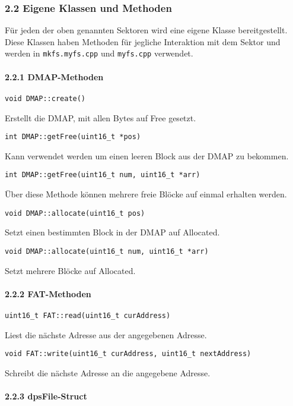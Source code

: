 \documentclass[]{article}
\let\oldparagraph\paragraph
\renewcommand{\paragraph}[1]{\oldparagraph{#1}\mbox{}}
\begin{document}
\hypertarget{eigene-klassen-und-methoden}{%
\subsubsection{2.2 Eigene Klassen und
Methoden}\label{eigene-klassen-und-methoden}}

Für jeden der oben genannten Sektoren wird eine eigene Klasse
bereitgestellt. Diese Klassen haben Methoden für jegliche Interaktion
mit dem Sektor und werden in \texttt{mkfs.myfs.cpp} und
\texttt{myfs.cpp} verwendet.

\hypertarget{dmap-methoden}{%
\paragraph{2.2.1 DMAP-Methoden}\label{dmap-methoden}}

\texttt{void\ DMAP::create()}

Erstellt die DMAP, mit allen Bytes auf Free gesetzt.

\texttt{int\ DMAP::getFree(uint16\_t\ *pos)}

Kann verwendet werden um einen leeren Block aus der DMAP zu bekommen.

\texttt{int\ DMAP::getFree(uint16\_t\ num,\ uint16\_t\ *arr)}

Über diese Methode können mehrere freie Blöcke auf einmal erhalten
werden.

\texttt{void\ DMAP::allocate(uint16\_t\ pos)}

Setzt einen bestimmten Block in der DMAP auf Allocated.

\texttt{void\ DMAP::allocate(uint16\_t\ num,\ uint16\_t\ *arr)}

Setzt mehrere Blöcke auf Allocated.

\hypertarget{fat-methoden}{%
\paragraph{2.2.2 FAT-Methoden}\label{fat-methoden}}

\texttt{uint16\_t\ FAT::read(uint16\_t\ curAddress)}

Liest die nächste Adresse aus der angegebenen Adresse.

\texttt{void\ FAT::write(uint16\_t\ curAddress,\ uint16\_t\ nextAddress)}

Schreibt die nächste Adresse an die angegebene Adresse.

\hypertarget{dpsfile-struct}{%
\paragraph{2.2.3 dpsFile-Struct}\label{dpsfile-struct}}
\end{document}
